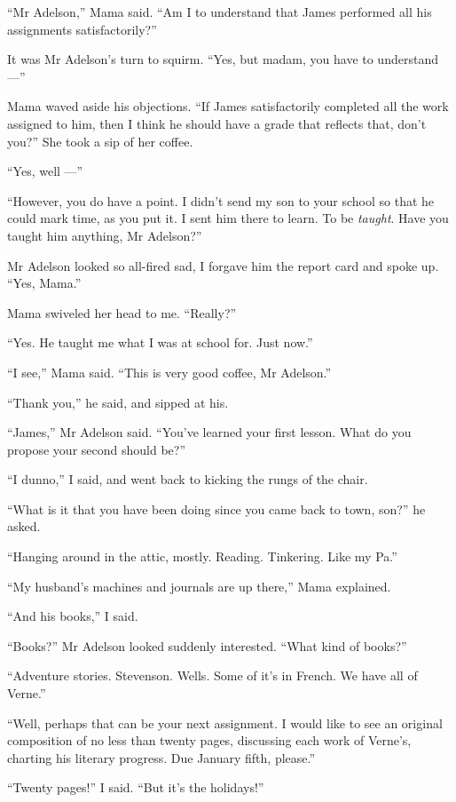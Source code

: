 ``Mr Adelson,'' Mama said.
``Am I to understand that James performed all his assignments satisfactorily?''

It was Mr Adelson's turn to squirm.
``Yes, but madam, you have to understand ---''

Mama waved aside his objections.
``If James satisfactorily completed all the work assigned to him, then I think 
he should have a grade that reflects that, don't you?''
She took a sip of her coffee.

``Yes, well ---''

``However, you do have a point. I didn't send my son to your school so that he 
could mark time, as you put it. I sent him there to learn. To be \emph{taught}. 
Have you taught him anything, Mr Adelson?''

Mr Adelson looked so all-fired sad, I forgave him the report card
and spoke up. ``Yes, Mama.''

Mama swiveled her head to me. ``Really?''

``Yes. He taught me what I was at school for. Just now.''

``I see,'' Mama said. ``This is very good coffee, Mr Adelson.''

``Thank you,'' he said, and sipped at his.

``James,'' Mr Adelson said.
``You've learned your first lesson. What do you propose your second should be?''

``I dunno,'' I said, and went back to kicking the rungs of the
chair.

``What is it that you have been doing since you came back to town, son?''
he asked.

``Hanging around in the attic, mostly. Reading. Tinkering. Like my Pa.''

``My husband's machines and journals are up there,'' Mama
explained.

``And his books,'' I said.

``Books?'' Mr Adelson looked suddenly interested.
``What kind of books?''

``Adventure stories. Stevenson. Wells. Some of it's in French. We have all of 
Verne.''

``Well, perhaps that can be your next assignment. I would like to see an 
original composition of no less than twenty pages, discussing each work of 
Verne's, charting his literary progress. Due January fifth, please.''

``Twenty pages!'' I said. ``But it's the holidays!''

